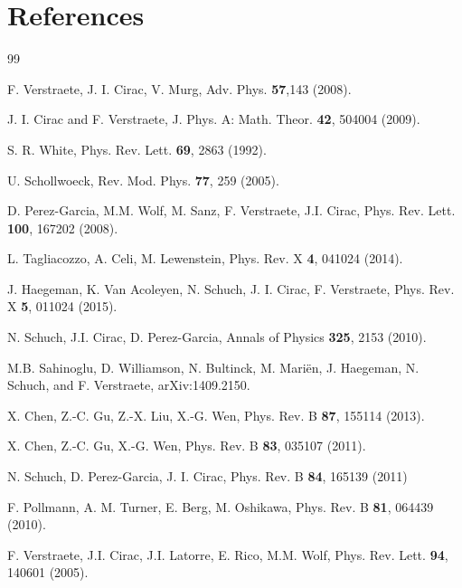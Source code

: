 \documentclass{elsarticle}
\begin{document}
\section*{References}

\begin{thebibliography}{99}

    F. Verstraete, J. I. Cirac, V. Murg,
    Adv. Phys. {\bf 57},143 (2008).


    J. I. Cirac and F. Verstraete, J. Phys. A: Math. Theor. {\bf 42}, 504004 (2009).

    S. R. White,
    Phys. Rev. Lett. {\bf 69}, 2863 (1992).

    U. Schollwoeck,
    Rev. Mod. Phys. {\bf 77}, 259 (2005).

    D. Perez-Garcia, M.M. Wolf, M. Sanz, F. Verstraete,  J.I. Cirac,
    Phys. Rev. Lett. {\bf 100}, 167202 (2008).


    L. Tagliacozzo, A. Celi,  M. Lewenstein,
    Phys. Rev. X {\bf 4}, 041024 (2014).

    J. Haegeman, K. Van Acoleyen, N. Schuch, J. I. Cirac,  F. Verstraete,
    Phys. Rev. X {\bf 5}, 011024 (2015).


    N. Schuch, J.I. Cirac,  D. Perez-Garcia,
    Annals of Physics {\bf 325}, 2153 (2010).

    M.B. Sahinoglu, D. Williamson, N. Bultinck, M. Mari\"en, J. Haegeman,
    N. Schuch, and F. Verstraete,
    arXiv:1409.2150.

    X. Chen, Z.-C. Gu, Z.-X. Liu,  X.-G. Wen,
    Phys. Rev. B {\bf 87}, 155114 (2013).

    X. Chen, Z.-C. Gu, X.-G. Wen,
    Phys. Rev. B {\bf 83}, 035107 (2011).

    N. Schuch, D. Perez-Garcia,  J. I. Cirac,
    Phys. Rev. B {\bf 84}, 165139 (2011)

    F. Pollmann, A. M. Turner, E. Berg,  M. Oshikawa,
    Phys. Rev. B {\bf 81}, 064439 (2010).

    F. Verstraete, J.I. Cirac, J.I. Latorre, E. Rico,  M.M. Wolf,
    Phys. Rev. Lett. {\bf 94}, 140601 (2005).


\end{thebibliography}
\end{document}
